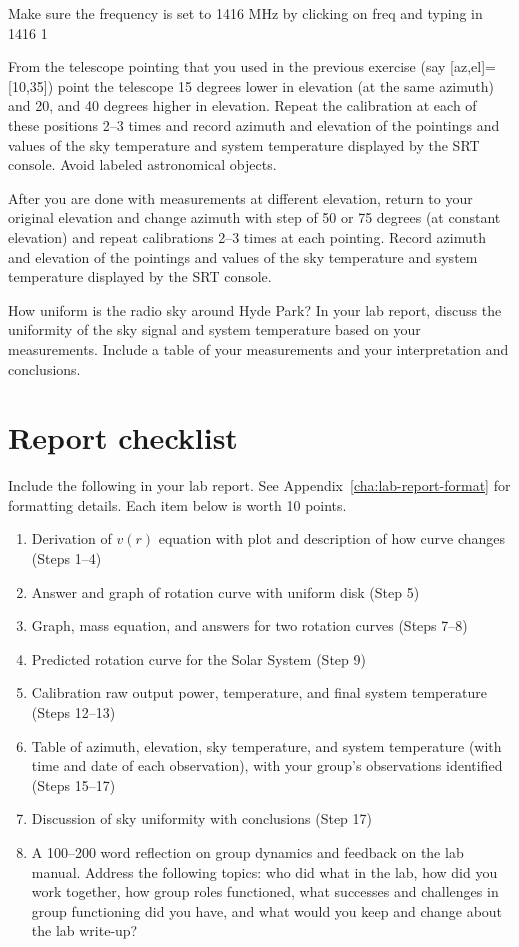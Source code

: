 \begin{steps}
	\item Make sure the frequency is set to 1416 MHz by clicking on freq and typing
	in 1416 1
	
	\item From the telescope pointing that you used in the previous exercise (say
	[az,el]=[10,35]) point the telescope 15 degrees lower in elevation (at the
	same azimuth) and 20, and 40 degrees higher in elevation. Repeat the
	calibration at each of these positions 2--3 times and record azimuth and
	elevation of the pointings and values of the sky temperature and system
	temperature displayed by the SRT console. Avoid labeled astronomical
	objects.

	\item After you are done with measurements at different elevation, return to your
	original elevation and change azimuth with step of 50 or 75 degrees (at
	constant elevation) and repeat calibrations 2--3 times at each pointing.
	Record azimuth and elevation of the pointings and values of the sky
	temperature and system temperature displayed by the SRT console.
	
	\item How uniform is the radio sky around Hyde Park? In your lab report,
	discuss the uniformity of the sky signal and system temperature based on
	your measurements. Include a table of your measurements and your
	interpretation and conclusions.
\end{steps}

\section{Report checklist}

Include the following in your lab report. See Appendix~\ref{cha:lab-report-format} for formatting details. Each item below is worth 10 points.

\begin{enumerate}
	\item Derivation of $v(r)$ equation with plot and description of how curve changes (Steps 1--4)
	\item Answer and graph of rotation curve with uniform disk (Step 5)
	\item Graph, mass equation, and answers for two rotation curves (Steps 7--8)
	\item Predicted rotation curve for the Solar System (Step 9)
	\item Calibration raw output power, temperature, and final system temperature (Steps 12--13)
	\item Table of azimuth, elevation, sky temperature, and system temperature (with time and date of each observation), with your group's observations identified (Steps 15--17)
	\item Discussion of sky uniformity with conclusions (Step 17)
	\item A 100--200 word reflection on group dynamics and feedback on the lab manual. Address the following topics: who did what in the lab, how did you work together, how group roles functioned, what successes and challenges in group functioning did you have, and what would you keep and change about the lab write-up?
\end{enumerate}
